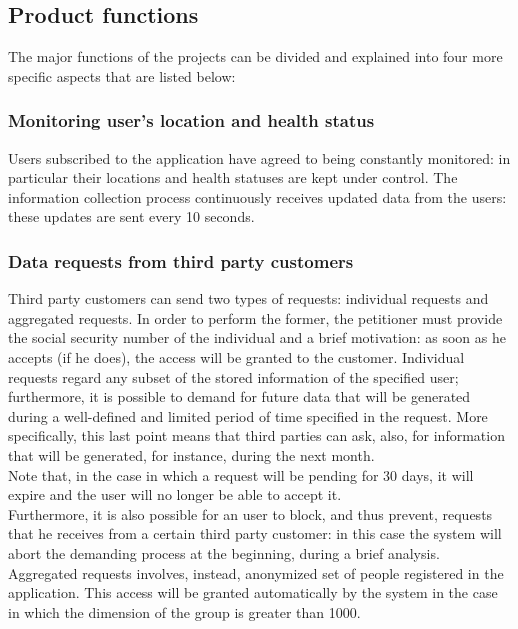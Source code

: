 \subsection{Product functions}
The major functions of the projects can be divided and explained into four more specific aspects that are listed below: 

\subsubsection{Monitoring user's location and health status}
Users subscribed to the application have agreed to being constantly monitored: in particular their locations and health statuses are kept under control. 
The information collection process continuously receives updated data from the users: these updates are sent every 10 seconds. \\

\subsubsection{Data requests from third party customers}
Third party customers can send two types of requests: individual requests and aggregated requests. 
In order to perform the former, the petitioner must provide the social security number of the individual and a brief motivation: as soon as he accepts (if he does), the access will be granted to the customer.
Individual requests regard any subset of the stored information of the specified user; furthermore, it is possible to demand for future data that will be generated during a well-defined and limited period of time specified in the request. 
More specifically, this last point means that third parties can ask, also, for information that will be generated, for instance, during the next month. \\
Note that, in the case in which a request will be pending for 30 days, it will expire and the user will no longer be able to accept it. \\
Furthermore, it is also possible for an user to block, and thus prevent, requests that he receives from a certain third party customer: in this case the system will abort the demanding process at the beginning, during a brief analysis.\\
Aggregated requests involves, instead, anonymized set of people registered in the application. 
This access will be granted automatically by the system in the case in which the dimension of the group is greater than 1000.   


